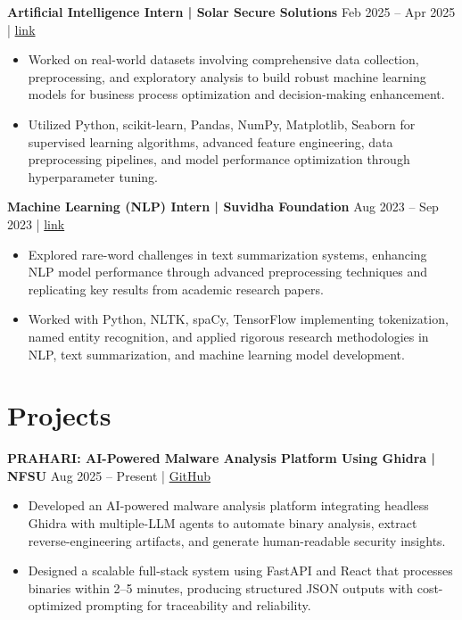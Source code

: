 \documentclass[a4paper,11pt]{article}
\newcommand{\resumeItemListStart}{\begin{itemize}[leftmargin=*,labelsep=1mm,itemsep=0pt,topsep=2pt]}
\newcommand{\resumeItemListEnd}{\end{itemize}\vspace{1mm}}
\begin{document}
\textbf{Artificial Intelligence Intern | Solar Secure Solutions} \hfill Feb 2025 -- Apr 2025 | \href{https://drive.google.com/file/d/1v5wkboBHZhA96TD6UUG0w7nRD0ga55KI/view?usp=sharing}{link}
\resumeItemListStart
\item Worked on real-world datasets involving comprehensive data collection, preprocessing, and exploratory analysis to build robust machine learning models for business process optimization and decision-making enhancement.
\item Utilized Python, scikit-learn, Pandas, NumPy, Matplotlib, Seaborn for supervised learning algorithms, advanced feature engineering, data preprocessing pipelines, and model performance optimization through hyperparameter tuning.
\resumeItemListEnd

\textbf{Machine Learning (NLP) Intern | Suvidha Foundation} \hfill Aug 2023 -- Sep 2023 | \href{https://drive.google.com/drive/folders/19H8OfldP-IzY1z7j5lbYPetJRdtEx4qy?usp=sharing}{link}
\resumeItemListStart
\item Explored rare-word challenges in text summarization systems, enhancing NLP model performance through advanced preprocessing techniques and replicating key results from academic research papers.
\item Worked with Python, NLTK, spaCy, TensorFlow implementing tokenization, named entity recognition, and applied rigorous research methodologies in NLP, text summarization, and machine learning model development.
\resumeItemListEnd


\section{\textbf{Projects}}

\textbf{PRAHARI: AI-Powered Malware Analysis Platform Using Ghidra | NFSU} \hfill Aug 2025 -- Present |
\href{https://github.com/MIHIR-RANJAN/PRAHARI-AI-POWERED-MALWARE-ANALYSIS-PLATFORM-USING-GHIDRA.git}{GitHub}
\begin{itemize}[leftmargin=*]
\item Developed an AI-powered malware analysis platform integrating headless Ghidra with multiple-LLM agents to automate binary analysis, extract reverse-engineering artifacts, and generate human-readable security insights.
\item Designed a scalable full-stack system using FastAPI and React that processes binaries within 2--5 minutes, producing structured JSON outputs with cost-optimized prompting for traceability and reliability.
\end{itemize}
\end{document}

